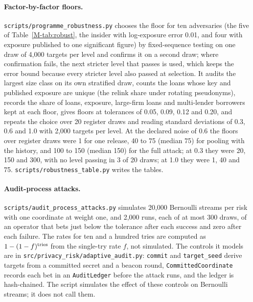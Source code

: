 \documentclass{jpc}
\begin{document}
\paragraph{Factor-by-factor floors.} \nolinkurl{scripts/programme_robustness.py} chooses the floor for ten adversaries (the five of Table~\ref{M-tab:robust}, the insider with log-exposure error 0.01, and four with exposure published to one significant figure) by fixed-sequence testing on one draw of 4,000 targets per level and confirms it on a second draw; where confirmation fails, the next stricter level that passes is used, which keeps the error bound because every stricter level also passed at selection. It audits the largest size class on its own stratified draw, counts the loans whose key and published exposure are unique (the relink share under rotating pseudonyms), records the share of loans, exposure, large-firm loans and multi-lender borrowers kept at each floor, gives floors at tolerances of 0.05, 0.09, 0.12 and 0.20, and repeats the choice over 20 register draws and reading standard deviations of 0.3, 0.6 and 1.0 with 2,000 targets per level. At the declared noise of 0.6 the floors over register draws were 1 for one release, 40 to 75 (median 75) for pooling with the history, and 100 to 150 (median 150) for the full attack; at 0.3 they were 20, 150 and 300, with no level passing in 3 of 20 draws; at 1.0 they were 1, 40 and 75. \nolinkurl{scripts/robustness_table.py} writes the tables.

\paragraph{Audit-process attacks.} \nolinkurl{scripts/audit_process_attacks.py} simulates 20,000 Bernoulli streams per risk with one coordinate at weight one, and 2,000 runs, each of at most 300 draws, of an operator that bets just below the tolerance after each success and zero after each failure. The rates for ten and a hundred tries are computed as $1-(1-f)^{\rm tries}$ from the single-try rate $f$, not simulated. The controls it models are in \nolinkurl{src/privacy_risk/adaptive_audit.py}: \texttt{commit} and \texttt{target\_seed} derive targets from a committed secret and a beacon round, \texttt{CommittedCoordinate} records each bet in an \texttt{AuditLedger} before the attack runs, and the ledger is hash-chained. The script simulates the effect of these controls on Bernoulli streams; it does not call them.
\end{document}
